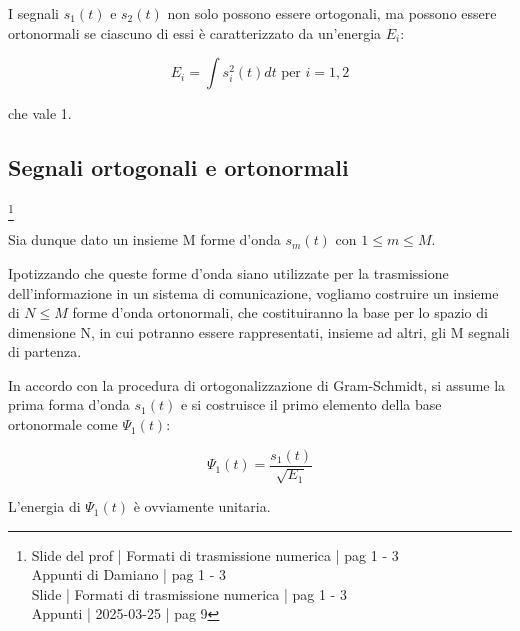 I segnali $s_1 (t)$ e $s_2 (t)$ non solo possono essere ortogonali, ma possono essere ortonormali se ciascuno di essi è caratterizzato da un'energia $E_i$: 

{
    \Large 
    \begin{equation}
        E_i = \int s_i ^{2} (t) dt \text{ per } i = 1, 2
    \end{equation}
}

che vale 1. \newline 

\newpage 

\subsection{Segnali ortogonali e ortonormali}
\footnote{Slide del prof | Formati di trasmissione numerica | pag 1 - 3\\  
Appunti di Damiano | pag 1 - 3\\
Slide | Formati di trasmissione numerica | pag  1 - 3\\
Appunti | 2025-03-25 | pag 9 
}

Sia dunque dato un insieme M forme d'onda $s_m (t)$ con $1 \le m \le M$. \newline 

Ipotizzando che queste forme d'onda siano utilizzate per la trasmissione dell'informazione in un sistema di comunicazione, 
vogliamo costruire un insieme di $N \le M$ forme d'onda ortonormali, 
che costituiranno la base per lo spazio di dimensione N, 
in cui potranno essere rappresentati, insieme ad altri, gli M segnali di partenza. \newline 

In accordo con la procedura di ortogonalizzazione di Gram-Schmidt, 
si assume la prima forma d'onda $s_1 (t)$ e si costruisce il primo elemento della base ortonormale come $\Psi_1 (t)$: 

{
    \Large 
    \begin{equation}
        \Psi_1 (t) = \frac{s_1 (t)}{\sqrt{E_1}}
    \end{equation}
}

L'energia di $\Psi_1 (t)$ è ovviamente unitaria. \newline 

